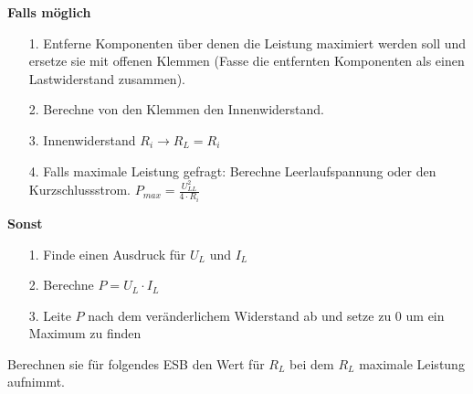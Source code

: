 																														\beginvor
\textbf{Falls möglich}
\begin{itemize}
  \item [1. ] Entferne Komponenten über denen die Leistung maximiert werden soll und ersetze sie mit offenen Klemmen (Fasse die entfernten Komponenten als einen Lastwiderstand zusammen).
  \item [2. ] Berechne von den Klemmen den Innenwiderstand.
  \item [3. ] Innenwiderstand $R_i \rightarrow R_L = R_i$
  \item [4. ] Falls maximale Leistung gefragt: Berechne Leerlaufspannung oder den Kurzschlussstrom. $\displaystyle P_{max} = \frac{U_{LL}^2} {4 \cdot R_i } $
\end{itemize}

\textbf{Sonst}

\begin{itemize}
  \item [1. ] Finde einen Ausdruck für $U_L$ und $I_L$
	\item [2. ] Berechne $P = U_L \cdot I_L$
	\item [3. ] Leite $P$ nach dem veränderlichem Widerstand ab und setze zu 0 um ein Maximum zu finden
\end{itemize}


																														\iend
\newpage
{}
\beginbsp
Berechnen sie für folgendes ESB den Wert für $R_L$ bei dem $R_L$ maximale Leistung aufnimmt.
\begin{center}
\end{center}
\iend

